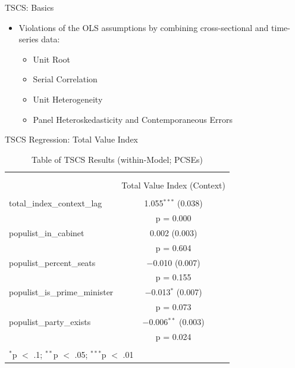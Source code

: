\documentclass[
  ignorenonframetext,
]{beamer}
\providecommand{\tightlist}{%
  \setlength{\itemsep}{0pt}\setlength{\parskip}{0pt}}
\begin{document}
\begin{frame}{TSCS: Basics}
\protect\hypertarget{tscs-basics}{}

\begin{itemize}
\tightlist
\item
  Violations of the OLS assumptions by combining cross-sectional and
  time-series data:

  \begin{itemize}
  \tightlist
  \item
    Unit Root
  \item
    Serial Correlation
  \item
    Unit Heterogeneity
  \item
    Panel Heteroskedasticity and Contemporaneous Errors
  \end{itemize}
\end{itemize}

\end{frame}

\begin{frame}{TSCS Regression: Total Value Index}
\protect\hypertarget{tscs-regression-total-value-index}{}

\begin{table}[!htbp] \centering 
  \caption{Table of TSCS Results (within-Model; PCSEs)} 
  \label{} 
\scriptsize 
\begin{tabular}{@{\extracolsep{5pt}}lc} 
\\[-1.8ex]\hline \\[-1.8ex] 
\\[-1.8ex] & Total Value Index (Context) \\ 
\hline \\[-1.8ex] 
 total\_index\_context\_lag & 1.055$^{***}$ (0.038) \\ 
  & p = 0.000 \\ 
  populist\_in\_cabinet & 0.002 (0.003) \\ 
  & p = 0.604 \\ 
  populist\_percent\_seats & $-$0.010 (0.007) \\ 
  & p = 0.155 \\ 
  populist\_is\_prime\_minister & $-$0.013$^{*}$ (0.007) \\ 
  & p = 0.073 \\ 
  populist\_party\_exists & $-$0.006$^{**}$ (0.003) \\ 
  & p = 0.024 \\ 
 \hline \\[-1.8ex] 
\multicolumn{2}{l}{$^{*}$p $<$ .1; $^{**}$p $<$ .05; $^{***}$p $<$ .01} \\ 
\end{tabular} 
\end{table}

\end{frame}
\end{document}
